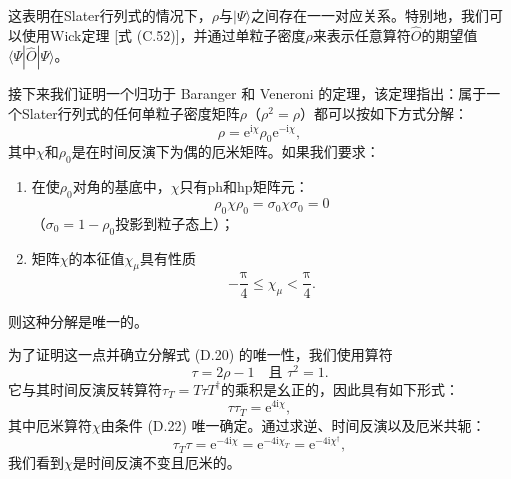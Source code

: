 这表明在Slater行列式的情况下，$\rho$与$|\Psi\rangle$之间存在一一对应关系。特别地，我们可以使用Wick定理
{[}式 (C.52){]}，并通过单粒子密度$\rho$来表示任意算符$\hat{O}$的期望值$\langle\Psi|\hat{O}|\Psi\rangle$。

接下来我们证明一个归功于 Baranger 和 Veneroni \cite{BV78,RS77b} 的定理，该定理指出：属于一个Slater行列式的任何单粒子密度矩阵$\rho$（$\rho^{2}=\rho$）都可以按如下方式分解：
\begin{equation}
\rho=\mathrm{e}^{\mathrm{i}\chi}\rho_{0}\mathrm{e}^{-\mathrm{i}\chi},\label{eq:appendix_d_baranger_veneroni}
\end{equation}
其中$\chi$和$\rho_{0}$是在时间反演下为偶的厄米矩阵。如果我们要求：
\begin{enumerate}
\item 在使$\rho_{0}$对角的基底中，$\chi$只有$\text{ph}$和$\text{hp}$矩阵元：
\begin{equation}
\rho_{0}\chi\rho_{0}=\sigma_{0}\chi\sigma_{0}=0\label{eq:appendix_d_chi_ph_condition}
\end{equation}
（$\sigma_{0}=1-\rho_{0}$投影到粒子态上）；
\item 矩阵$\chi$的本征值$\chi_{\mu}$具有性质
\begin{equation}
-\frac{\mathrm{\pi}}{4}\leqslant\chi_{\mu}<\frac{\mathrm{\pi}}{4}.\label{eq:appendix_d_chi_range}
\end{equation}
\end{enumerate}
则这种分解是唯一的。

为了证明这一点并确立分解式 (D.20) 的唯一性，我们使用算符
\begin{equation}
\tau=2\rho-1\quad\text{且 }\tau^{2}=1.\label{eq:appendix_d_tau_def}
\end{equation}
它与其时间反演反转算符$\tau_{T}=T\tau T^{\dagger}$的乘积是幺正的，因此具有如下形式：
\begin{equation}
\tau\tau_{T}=\mathrm{e}^{4\mathrm{i}\chi},\label{eq:appendix_d_tau_taut}
\end{equation}
其中厄米算符$\chi$由条件 (D.22) 唯一确定。通过求逆、时间反演以及厄米共轭：
\begin{equation}
\tau_{T}\tau=\mathrm{e}^{-4\mathrm{i}\chi}=\mathrm{e}^{-4\mathrm{i}\chi_{T}}=\mathrm{e}^{-4\mathrm{i}\chi^{\dagger}},\label{eq:appendix_d_taut_tau}
\end{equation}
我们看到$\chi$是时间反演不变且厄米的。

